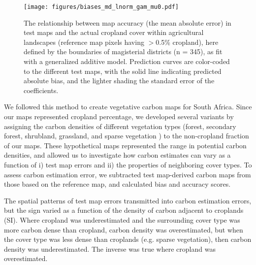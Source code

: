 \documentclass{pnastwo2}
\begin{document}
\begin{article}
\begin{figure}[!h]
\centerline{\texttt{[image: figures/biases\_md\_lnorm\_gam\_mu0.pdf]}}
\caption{The relationship between map accuracy (the mean absolute error) in test maps and the actual cropland cover within agricultural landscapes (reference map pixels having $>$0.5\% cropland), here defined by the boundaries of magisterial districts (n = 345), as fit with a generalized additive model. Prediction curves are color-coded to the different test maps, with the solid line indicating predicted absolute bias, and the lighter shading the standard error of the coefficients.}\label{afoto2}
\end{figure}

We followed this method to create vegetative carbon maps for South Africa. Since our maps represented cropland percentage, we developed several variants by assigning the carbon densities of different vegetation types (forest, secondary forest, shrubland, grassland, and sparse vegetation \cite{ruesch_new_2008}) to the non-cropland fraction of our maps. These hypothetical maps represented the range in potential carbon densities, and allowed us to investigate how carbon estimates can vary as a function of i) test map errors and ii) the properties of neighboring cover types. To assess carbon estimation error, we subtracted test map-derived carbon maps from those based on the reference map, and calculated bias and accuracy scores. 

The spatial patterns of test map errors transmitted into carbon estimation errors, but the sign varied as a function of the density of carbon adjacent to croplands (SI). Where cropland was underestimated and the surrounding cover type was more carbon dense than cropland, carbon density was overestimated, but when the cover type was less dense than croplands (e.g. sparse vegetation), then carbon density was underestimated. The inverse was true where cropland was overestimated. 


\end{article}
\end{document}

